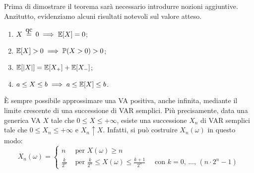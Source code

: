 Prima di dimostrare il teorema sarà necessario introdurre nozioni aggiuntive.
Anzitutto, evidenziamo alcuni risultati notevoli sul valore atteso.
\begin{prop}
	\Fixvmode
	\begin{enumerate}
		\item $X \aceq 0 \implies \EE[X] = 0$;
		\item $\mathbb E[X] > 0 \implies \mathbb P(X>0) > 0$;
		\item $\mathbb E[\lvert X\rvert] = \mathbb E[X_+] + \mathbb E[X_-]$;
		\item $a \leq X \leq b \implies a \leq \mathbb E[X] \leq b$.
	\end{enumerate}
\end{prop}

\begin{oss}\label{costruzione-VAR-semplice}
  È sempre possibile approssimare una VA positiva, anche infinita, mediante il limite crescente di una successione di VAR semplici.
  Più precisamente, data una generica VA $X$ tale che $0 \le X \le +\infty$, esiste una successione ${X_n}$ di VAR semplici tale che $0 \le X_n \le +\infty$ e $X_n \uparrow X$.
  Infatti, si può costruire $X_n(\omega)$ in questo modo:
  $$
    X_n(\omega) =
    \begin{cases}
      n & \text{ per } X(\omega) \ge n \\
      \frac k {2^n}
        & \text{ per } \frac k {2^n} \le X(\omega) \le \frac {k+1} {2^n}
        \quad\text{ con } k = 0, \, \dots, \, (n \cdot 2^n - 1)
    \end{cases}
  $$

  \begin{figure}[ht]
    \centering
\end{figure}
\end{oss}
